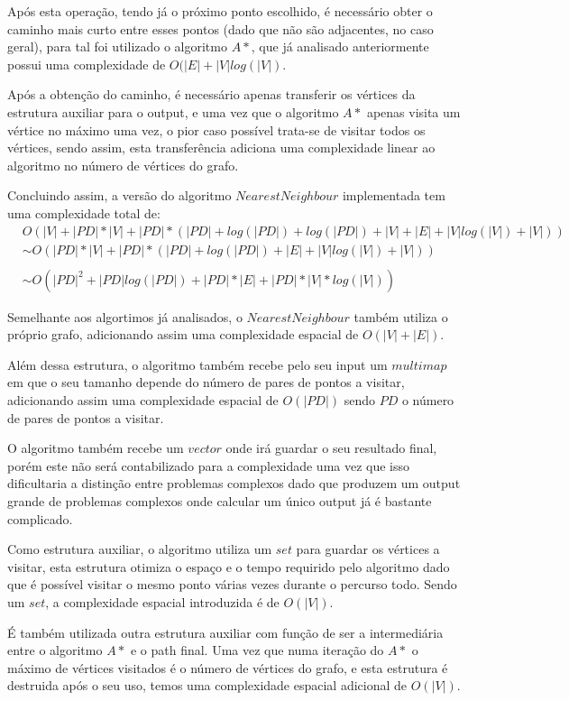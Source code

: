 \documentclass[article, a4paper, 12pt, oneside]{memoir}
\begin{document}
Após esta operação, tendo já o próximo ponto escolhido, é necessário obter o caminho mais curto entre esses pontos (dado que não são adjacentes, no caso geral), para tal foi utilizado o algoritmo $A*$, que já analisado anteriormente possui uma complexidade de $O(|E|+|V|log(|V|)$.

Após a obtenção do caminho, é necessário apenas transferir os vértices da estrutura auxiliar para o output, e uma vez que o algoritmo $A*$ apenas visita um vértice no máximo uma vez, o pior caso possível trata-se de visitar todos os vértices, sendo assim, esta transferência adiciona uma complexidade linear ao algoritmo no número de vértices do grafo.

Concluindo assim, a versão do algoritmo $NearestNeighbour$ implementada tem uma complexidade total de:
\begin{align*}
&O(|V|+|PD|*|V| + |PD| * (|PD| + log(|PD|) + log(|PD|) + |V| + |E|+|V|log(|V|) + |V|))\\
&\sim O(|PD|*|V| + |PD| * (|PD| + log(|PD|)+|E|+|V|log(|V|) + |V|))\\\\
&\sim O(|PD|^2 + |PD|log(|PD|) + |PD|*|E| + |PD|*|V|*log(|V|))
\end{align*}

Semelhante aos algortimos já analisados, o $NearestNeighbour$ também utiliza o próprio grafo, adicionando assim uma complexidade espacial de $O(|V|+|E|)$.

Além dessa estrutura, o algoritmo também recebe pelo seu input um $multimap$ em que o seu tamanho depende do número de pares de pontos a visitar, adicionando assim uma complexidade espacial de $O(|PD|)$ sendo $PD$ o número de pares de pontos a visitar.

O algoritmo também recebe um $vector$ onde irá guardar o seu resultado final, porém este não será contabilizado para a complexidade uma vez que isso dificultaria a distinção entre problemas complexos dado que produzem um output grande de problemas complexos onde calcular um único output já é bastante complicado.

Como estrutura auxiliar, o algoritmo utiliza um $set$ para guardar os vértices a visitar, esta estrutura otimiza o espaço e o tempo requirido pelo algoritmo dado que é possível visitar o mesmo ponto várias vezes durante o percurso todo. Sendo um $set$, a complexidade espacial introduzida é de $O(|V|)$.

É também utilizada outra estrutura auxiliar com função de ser a intermediária entre o algoritmo $A*$ e o path final. Uma vez que numa iteração do $A*$ o máximo de vértices visitados é o número de vértices do grafo, e esta estrutura é destruida após o seu uso, temos uma complexidade espacial adicional de $O(|V|)$.
\end{document}
